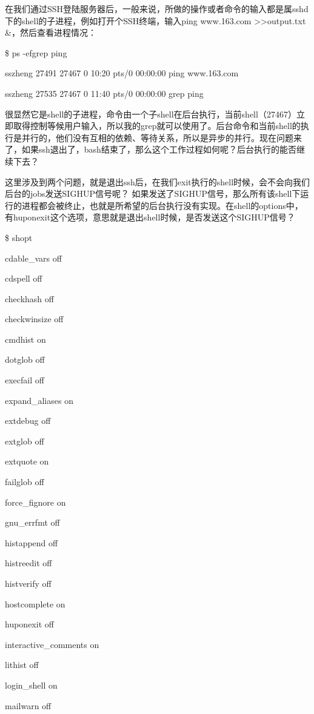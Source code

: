 \documentclass[letterpaper,10pt]{sphinxmanual}
\begin{document}
在我们通过SSH登陆服务器后，一般来说，所做的操作或者命令的输入都是属sshd下的shell的子进程，例如打开个SSH终端，输入ping www.163.com \textgreater{}\textgreater{}output.txt \&，然后查看进程情况：

\$ ps -ef\textbar{}grep ping

sszheng 27491 27467 0 10:20 pts/0    00:00:00 ping www.163.com

sszheng 27535 27467 0 11:40 pts/0    00:00:00 grep ping

很显然它是shell的子进程，命令由一个子shell在后台执行，当前shell（27467）立即取得控制等候用户输入，所以我的grep就可以使用了。后台命令和当前shell的执行是并行的，他们没有互相的依赖、等待关系，所以是异步的并行。现在问题来了，如果ssh退出了，bash结束了，那么这个工作过程如何呢？后台执行的能否继续下去？

这里涉及到两个问题，就是退出ssh后，在我们exit执行的shell时候，会不会向我们后台的jobs发送SIGHUP信号呢？
如果发送了SIGHUP信号，那么所有该shell下运行的进程都会被终止，也就是所希望的后台执行没有实现。在shell的options中，有huponexit这个选项，意思就是退出shell时候，是否发送这个SIGHUP信号？

\$ shopt

cdable\_vars     off

cdspell         off

checkhash       off

checkwinsize    off

cmdhist         on

dotglob         off

execfail        off

expand\_aliases on

extdebug        off

extglob         off

extquote        on

failglob        off

force\_fignore   on

gnu\_errfmt      off

histappend      off

histreedit      off

histverify      off

hostcomplete    on

huponexit       off

interactive\_comments    on

lithist         off

login\_shell     on

mailwarn        off
\end{document}
